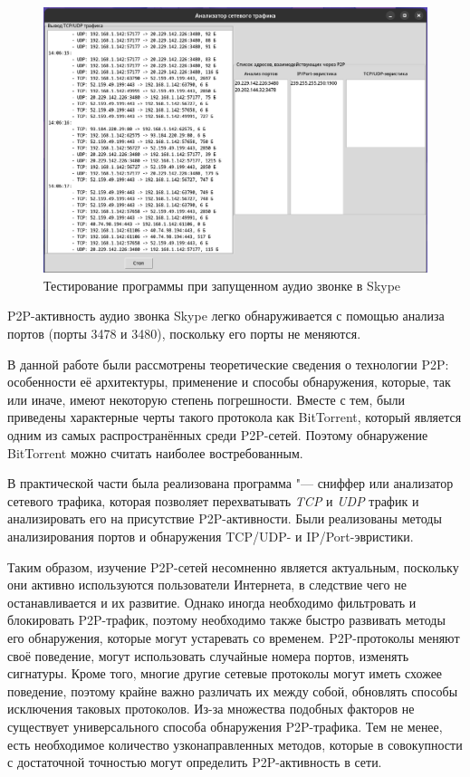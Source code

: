 \documentclass[bachelor, och, coursework]{SCWorks}
\begin{document}
\begin{figure}[H]
    \centering
    \includegraphics[width=0.999\textwidth]{test4.png}
    \caption{Тестирование программы при запущенном аудио звонке в Skype}
    \label{test4}
\end{figure}

P2P-активность аудио звонка Skype легко обнаруживается с помощью анализа портов (порты 3478 и 3480), поскольку его порты не меняются.

\conclusion
В данной работе были рассмотрены теоретические сведения о технологии P2P: особенности её архитектуры, применение
и способы обнаружения, которые, так или иначе, имеют некоторую степень погрешности. Вместе с тем, были приведены характерные черты такого протокола как BitTorrent, который является одним из самых распространённых среди P2P-сетей.
Поэтому обнаружение BitTorrent можно считать наиболее востребованным.

В практической части была реализована программа "--- сниффер или анализатор сетевого трафика, которая позволяет
перехватывать \textit{TCP} и \textit{UDP} трафик и анализировать его на присутствие P2P-активности. Были реализованы методы анализирования портов и обнаружения TCP/UDP- и IP/Port-эвристики.

Таким образом, изучение P2P-сетей несомненно является актуальным, поскольку они активно используются пользователи Интернета, в следствие чего не останавливается и их развитие. Однако иногда необходимо фильтровать и блокировать P2P-трафик, поэтому необходимо также быстро развивать методы его обнаружения, которые могут устаревать со временем. P2P-протоколы меняют своё поведение, могут использовать случайные номера портов, изменять сигнатуры. Кроме того, многие другие сетевые протоколы могут иметь схожее поведение, поэтому крайне важно различать их между собой, обновлять способы исключения таковых протоколов. Из-за множества подобных факторов не существует универсального способа обнаружения P2P-трафика. Тем не менее, есть необходимое количество узконаправленных методов, которые в совокупности с достаточной 
точностью могут определить P2P-активность в сети.
\end{document}

